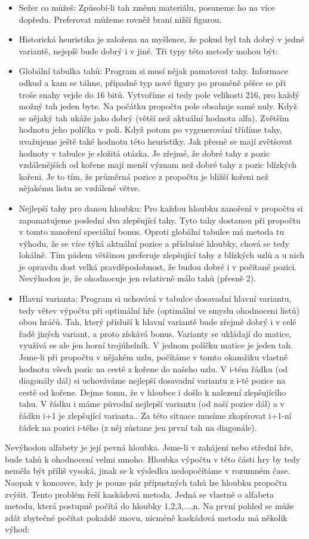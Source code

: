 \documentclass[11pt, titlepage]{article}
\begin{document}
\begin{itemize}
	\item Sežer co můžeš: Způsobí-li tah změnu materiálu, posuneme ho na více dopředu. Preferovat můžeme rovněž braní nižší figurou.
	\item Historická heuristika je založena na myšlence, že pokud byl tah dobrý v jedné variantě, nejspíš bude dobrý i v jiné. Tři typy této metody mohou být:
	\item Globální tabulka tahů: Program si musí nějak pamatovat tahy. Informace odkud a kam se táhne, případně typ nové figury po proměně pěšce se při troše snahy vejde do 16 bitů. Vytvoříme si tedy pole velikosti 216, pro každý možný tah jeden byte. Na počátku propočtu pole obsahuje samé nuly. Když se nějaký tah ukáže jako dobrý (větší než aktuální hodnota alfa). Zvětším hodnotu jeho políčka v poli. Když potom po vygenerování třídíme tahy, uvažujeme ještě také hodnotu této heuristiky. Jak přesně se mají zvětšovat hodnoty v tabulce je složitá otázka. Je zřejmé, že dobré tahy z pozic vzdálenějších od kořene mají menší význam než dobré tahy z pozic blízkých kořeni. Je to tím, že průměrná pozice z propočtu je bližší kořeni než nějakému listu ze vzdálené větve.
	\item Nejlepší tahy pro danou hloubku: Pro každou hloubku zanoření v propočtu si zapamatujeme poslední dva zlepšující tahy. Tyto tahy dostanou při propočtu v tomto zanoření speciální bonus. Oproti globální tabulce má metoda tu výhodu, že se více týká aktuální pozice a příslušné hloubky, chová se tedy lokálně. Tím pádem většinou preferuje zlepšující tahy z blízkých uzlů a u nich je opravdu dost velká pravděpodobnost, že budou dobré i v počítané pozici. Nevýhodou je, že ohodnocuje jen relativně málo tahů (přesně 2).
	\item Hlavní varianta: Program si uchovává v tabulce dosavadní hlavní variantu, tedy větev výpočtu při optimální hře (optimální ve smyslu ohodnoceni listů) obou hráčů. Tah, který přísluší k hlavní variantě bude zřejmě dobrý i v celé řadě jiných variant, a proto získává bonus. Varianty se ukládají do matice, využívá se ale jen horní trojúhelník. V jednom políčku matice je jeden tah. Jsme-li při propočtu v nějakém uzlu, počítáme v tomto okamžiku vlastně hodnotu všech pozic na cestě z kořene do našeho uzlu. V i-tém řádku (od diagonály dál) si uchováváme nejlepší dosavadní variantu z i-té pozice na cestě od kořene. Dejme tomu, že v hloubce i došlo k nalezení zlepšujícího tahu. V řádku i máme původní nejlepší variantu (od naší pozice dál) a v řádku i+1 je zlepšující varianta.. Za této situace musíme zkopírovat i+1-ní řádek na pozici i-tého (z něj zůstane jen první tah na diagonále).
\end{itemize}
Nevýhodou alfabety je její pevná hloubka. Jsme-li v zahájení nebo střední hře, bude tahů k ohodnocení velmi mnoho. Hloubka výpočtu v této části hry by tedy neměla být příliš vysoká, jinak se k výsledku nedopočítáme v rozumném čase. Naopak v koncovce, kdy je pouze pár přípustných tahů lze hloubku propočtu zvýšit.
Tento problém řeší kaskádová metoda. Jedná se vlastně o alfabeta metodu, která postupně počítá do hloubky 1,2,3,...,n. Na první pohled se může zdát zbytečné počítat pokaždé znovu, nicméně kaskádová metoda má několik výhod:
\end{document}

